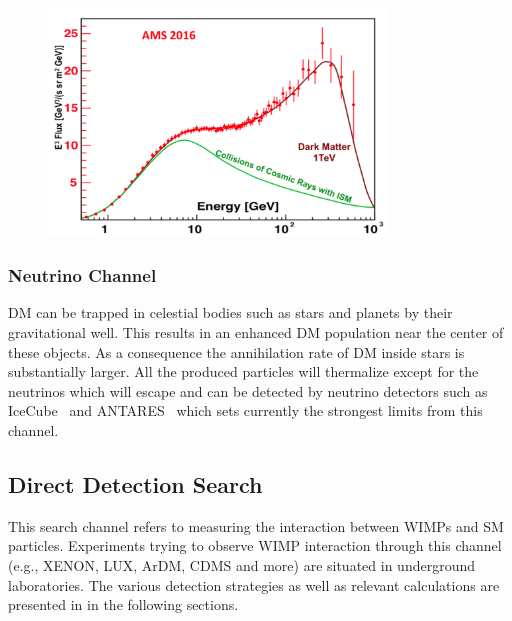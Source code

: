 \begin{figure}[]
	\centering
	\includegraphics[width=0.8\textwidth]{figs/AMS02.png}
	\label{fig:AMS}
\end{figure}  

\subsubsection{Neutrino Channel}

DM can be trapped in celestial bodies such as stars and planets by their gravitational well. This results in an enhanced DM population near the center of these objects. As a consequence the annihilation rate of DM inside stars is substantially larger. All the produced particles will thermalize except for the neutrinos which will escape and can be detected by neutrino detectors such as IceCube~\cite{Achterberg:2006md} and ANTARES~\cite{Collaboration:2011nsa} which sets currently the strongest limits from this channel.

\subsection{Direct Detection Search}
\label{subsec:directdetection}

This search channel refers to measuring the interaction between WIMPs and SM particles. Experiments trying to observe WIMP interaction through this channel (e.g., XENON, LUX, ArDM, CDMS and more) are situated in underground laboratories. The various detection strategies as well as relevant calculations are presented in in the following sections.

